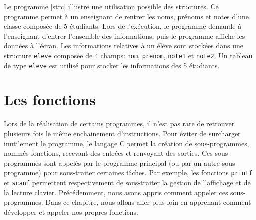 \documentclass[a4paper,11pt]{book}
\theoremstyle{definition}
\begin{document}
Le programme \ref{strc} illustre une utilisation possible des structures. Ce programme permet à un enseignant de rentrer les noms, prénoms et notes d'une classe composée de 5 étudiants. Lors de l'exécution, le programme demande à l'enseignant d'entrer l'ensemble des informations, puis le programme affiche les données à l'écran. Les informations relatives à un élève sont stockées dans une structure \texttt{eleve} composée de 4 champs: \texttt{nom}, \texttt{prenom}, \texttt{note1} et \texttt{note2}. Un tableau de type \texttt{eleve} est utilisé pour stocker les informations des 5 étudiants.




\chapter{Les fonctions}\label{fonction_chap}
Lors de la réalisation de certains programmes, il n'est pas rare de retrouver plusieurs fois le même enchainement d'instructions. Pour éviter de surcharger inutilement le programme, le langage C permet la création de sous-programmes, nommés fonctions, recevant des entrées et renvoyant des sorties. Ces sous-programmes sont appelés par le programme principal (ou par un autre sous-programme) pour sous-traiter certaines tâches. Par exemple, les fonctions \texttt{printf} et \texttt{scanf} permettent respectivement de sous-traiter la gestion de l'affichage et de la lecture clavier. Précédemment, nous avons appris comment appeler ces sous-programmes. Dans ce chapitre, nous allons aller plus loin en apprenant comment développer et appeler nos propres fonctions. 
\end{document}
